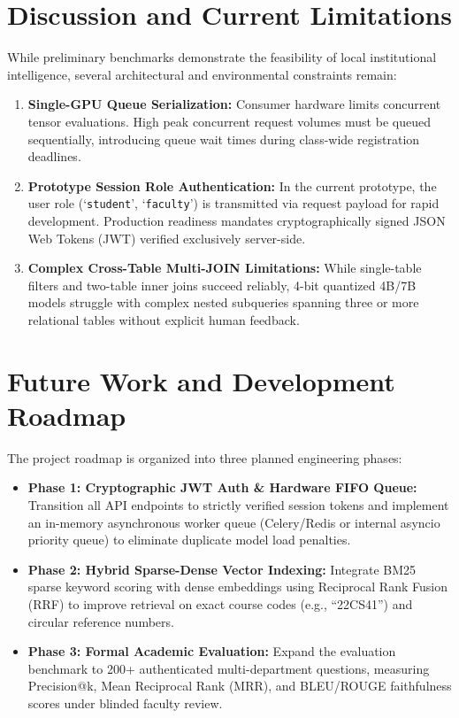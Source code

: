 \documentclass[conference]{IEEEtran}
\begin{document}
\section{Discussion and Current Limitations}
While preliminary benchmarks demonstrate the feasibility of local institutional intelligence, several architectural and environmental constraints remain:
\begin{enumerate}
    \item \textbf{Single-GPU Queue Serialization:} Consumer hardware limits concurrent tensor evaluations. High peak concurrent request volumes must be queued sequentially, introducing queue wait times during class-wide registration deadlines.
    \item \textbf{Prototype Session Role Authentication:} In the current prototype, the user role (`\texttt{student}', `\texttt{faculty}') is transmitted via request payload for rapid development. Production readiness mandates cryptographically signed JSON Web Tokens (JWT) verified exclusively server-side.
    \item \textbf{Complex Cross-Table Multi-JOIN Limitations:} While single-table filters and two-table inner joins succeed reliably, 4-bit quantized 4B/7B models struggle with complex nested subqueries spanning three or more relational tables without explicit human feedback.
\end{enumerate}

\section{Future Work and Development Roadmap}
The project roadmap is organized into three planned engineering phases:
\begin{itemize}
    \item \textbf{Phase 1: Cryptographic JWT Auth \& Hardware FIFO Queue:} Transition all API endpoints to strictly verified session tokens and implement an in-memory asynchronous worker queue (Celery/Redis or internal asyncio priority queue) to eliminate duplicate model load penalties.
    \item \textbf{Phase 2: Hybrid Sparse-Dense Vector Indexing:} Integrate BM25 sparse keyword scoring with dense embeddings using Reciprocal Rank Fusion (RRF) to improve retrieval on exact course codes (e.g., ``22CS41'') and circular reference numbers.
    \item \textbf{Phase 3: Formal Academic Evaluation:} Expand the evaluation benchmark to 200+ authenticated multi-department questions, measuring Precision@k, Mean Reciprocal Rank (MRR), and BLEU/ROUGE faithfulness scores under blinded faculty review.
\end{itemize}
\end{document}
